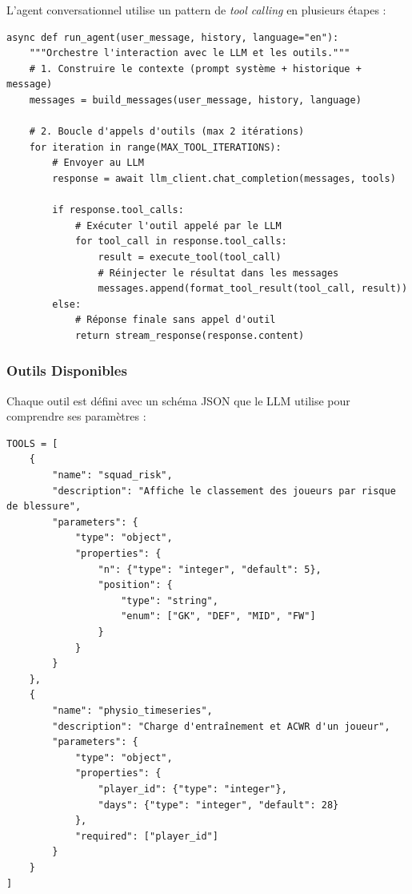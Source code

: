 L'agent conversationnel utilise un pattern de \textit{tool calling} en plusieurs étapes :

\begin{lstlisting}[style=codeframe]
async def run_agent(user_message, history, language="en"):
    """Orchestre l'interaction avec le LLM et les outils."""
    # 1. Construire le contexte (prompt système + historique + message)
    messages = build_messages(user_message, history, language)

    # 2. Boucle d'appels d'outils (max 2 itérations)
    for iteration in range(MAX_TOOL_ITERATIONS):
        # Envoyer au LLM
        response = await llm_client.chat_completion(messages, tools)

        if response.tool_calls:
            # Exécuter l'outil appelé par le LLM
            for tool_call in response.tool_calls:
                result = execute_tool(tool_call)
                # Réinjecter le résultat dans les messages
                messages.append(format_tool_result(tool_call, result))
        else:
            # Réponse finale sans appel d'outil
            return stream_response(response.content)
\end{lstlisting}

\subsubsection{Outils Disponibles}

Chaque outil est défini avec un schéma JSON que le LLM utilise pour comprendre ses paramètres :

\begin{lstlisting}[style=codeframe]
TOOLS = [
    {
        "name": "squad_risk",
        "description": "Affiche le classement des joueurs par risque de blessure",
        "parameters": {
            "type": "object",
            "properties": {
                "n": {"type": "integer", "default": 5},
                "position": {
                    "type": "string",
                    "enum": ["GK", "DEF", "MID", "FW"]
                }
            }
        }
    },
    {
        "name": "physio_timeseries",
        "description": "Charge d'entraînement et ACWR d'un joueur",
        "parameters": {
            "type": "object",
            "properties": {
                "player_id": {"type": "integer"},
                "days": {"type": "integer", "default": 28}
            },
            "required": ["player_id"]
        }
    }
]
\end{lstlisting}

